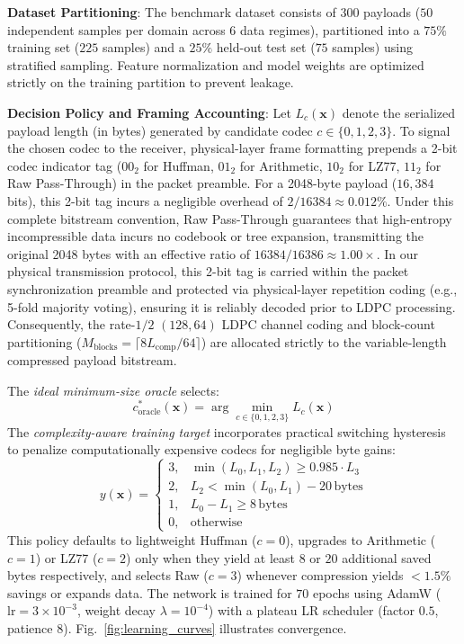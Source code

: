 \documentclass[conference]{IEEEtran}
\begin{document}
\textbf{Dataset Partitioning}: The benchmark dataset consists of $300$ payloads ($50$ independent samples per domain across 6 data regimes), partitioned into a $75\%$ training set ($225$ samples) and a $25\%$ held-out test set ($75$ samples) using stratified sampling. Feature normalization and model weights are optimized strictly on the training partition to prevent leakage.

\textbf{Decision Policy and Framing Accounting}: Let $L_c(\mathbf{x})$ denote the serialized payload length (in bytes) generated by candidate codec $c \in \{0, 1, 2, 3\}$. To signal the chosen codec to the receiver, physical-layer frame formatting prepends a 2-bit codec indicator tag ($00_2$ for Huffman, $01_2$ for Arithmetic, $10_2$ for LZ77, $11_2$ for Raw Pass-Through) in the packet preamble. For a 2048-byte payload ($16{,}384$ bits), this 2-bit tag incurs a negligible overhead of $2/16384 \approx 0.012\%$. Under this complete bitstream convention, Raw Pass-Through guarantees that high-entropy incompressible data incurs no codebook or tree expansion, transmitting the original 2048 bytes with an effective ratio of $16384/16386 \approx \mathbf{1.00\times}$. In our physical transmission protocol, this 2-bit tag is carried within the packet synchronization preamble and protected via physical-layer repetition coding (e.g., 5-fold majority voting), ensuring it is reliably decoded prior to LDPC processing. Consequently, the rate-$1/2$ $(128, 64)$ LDPC channel coding and block-count partitioning ($M_{\text{blocks}} = \lceil 8 L_{\text{comp}} / 64 \rceil$) are allocated strictly to the variable-length compressed payload bitstream.

The \textit{ideal minimum-size oracle} selects:
\begin{equation}
    c^*_{\text{oracle}}(\mathbf{x}) = \arg\min_{c \in \{0, 1, 2, 3\}} L_c(\mathbf{x})
    \label{eq:ideal_oracle}
\end{equation}
The \textit{complexity-aware training target} incorporates practical switching hysteresis to penalize computationally expensive codecs for negligible byte gains:
\begin{equation}
    y(\mathbf{x}) = \begin{cases}
    3, & \min(L_0, L_1, L_2) \ge 0.985 \cdot L_{3} \\
    2, & L_{2} < \min(L_{0}, L_{1}) - 20\,\text{bytes} \\
    1, & L_{0} - L_{1} \ge 8\,\text{bytes} \\
    0, & \text{otherwise}
    \end{cases}
    \label{eq:cost_sensitive_policy}
\end{equation}
This policy defaults to lightweight Huffman ($c=0$), upgrades to Arithmetic ($c=1$) or LZ77 ($c=2$) only when they yield at least $8$ or $20$ additional saved bytes respectively, and selects Raw ($c=3$) whenever compression yields $< 1.5\%$ savings or expands data. The network is trained for $70$ epochs using AdamW ($\text{lr} = 3 \times 10^{-3}$, weight decay $\lambda = 10^{-4}$) with a plateau LR scheduler (factor $0.5$, patience $8$). Fig.~\ref{fig:learning_curves} illustrates convergence.
\end{document}
